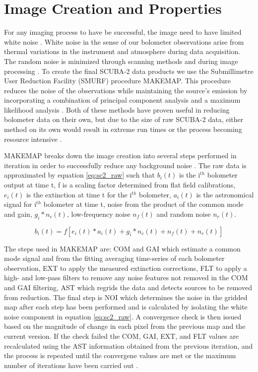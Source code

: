 \section{Image Creation and Properties}

For any imaging process to have be successful, the image need to have limited white noise \citep{chapin2013}.  White noise in the sense of our bolometer observations arise from thermal variations in the instrument and atmosphere during data acquisition. The random noise is minimized through scanning methods and during image processing \citep{chapin2013}.  To create the final SCUBA-2 data products we use the Submillimetre User Reduction Facility (SMURF) procedure MAKEMAP.  This procedure reduces the noise of the observations while maintaining the source's emission by incorporating a combination of principal component analysis and a maximum likelihood analysis \citep{chapin2013}.  Both of these methods have proven useful in reducing bolometer data on their own, but due to the size of raw SCUBA-2 data, either method on its own would result in extreme run times or the process becoming resource intensive \citep{chapin2013}.


MAKEMAP breaks down the image creation into several steps performed in iteration in order to successfully reduce any background noise \citep{chapin2013}.  The raw data is approximated by equation \ref{eq:sc2_raw} such that $b_i(t)$ is the i$^{th}$ bolometer output at time t, f is a scaling factor determined from flat field calibrations, $e_i(t)$ is the extinction at time t for the i$^{th}$ bolometer, $a_i(t)$ is the astronomical signal for i$^{th}$ bolometer at time t, noise from the product of the common mode and gain, $g_i*n_c(t)$, low-frequency noise $n_f(t)$ and random noise $n_r(t)$\citep{chapin2013}.

\begin{equation}\label{eq:sc2_raw}
  b_i(t) = f \left[ e_i(t)*a_i(t) + g_i*n_c(t)+n_f(t)+n_r(t)\right]
\end{equation}

The steps used in MAKEMAP are:  COM and GAI which estimate a common mode signal and from the fitting averaging time-series of each bolometer observation, EXT to apply the measured extinction corrections, FLT to apply a high- and low-pass filters to remove any noise features not removed in the COM and GAI filtering, AST which regrids the data and detects sources to be removed from reduction.  The final step is NOI which determines the noise in the gridded map after each step has been performed and is calculated by isolating the white noise component in equation \ref{eq:sc2_raw}.  A convergence check is then issued based on the magnitude of change in each pixel from the previous map and the current version.  If the check failed the COM, GAI, EXT, and FLT values are recalculated using the AST information obtained from the previous iteration, and the process is repeated until the convergene values are met or the maximum number of iterations have been carried out \citep{chapin2013}.

